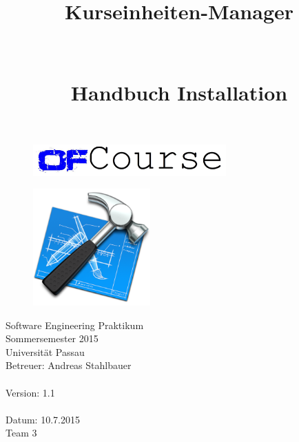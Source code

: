 \documentclass[a4paper, 12pt]{scrreprt}
\begin{document}
	\thispagestyle{plain}
	
	\begin{titlepage}
		\begin{center}
			\begin{figure}[ht]
				\centering
				\includegraphics[width=0.66\textwidth, angle=0]{logo/name_blau_ofCourse.jpg}
			\end{figure}
			
			\begin{title}
				\title{\Huge{\textbf{Kurseinheiten-Manager \\ \ \\ 
							\ \\
							Handbuch Installation
							}}}
			\begin{figure}[th]
				\centering
				\includegraphics[width=0.40\textwidth, angle=0]{Grafiken/installation-instructions-icon}
			\end{figure}
				
			\end{title}
			\hspace{3cm}
			
			Software Engineering Praktikum \\
			Sommersemester 2015\\
			Universität Passau\\
			
			
			Betreuer: Andreas Stahlbauer \\
        	\hspace{1,5cm}\\
        	Version: 1.1 \\
        	\hspace{1,5cm}\\
        	Datum: 10.7.2015\\[28pt]
        	Team 3 \\


\end{center}
\end{titlepage}
\end{document}

